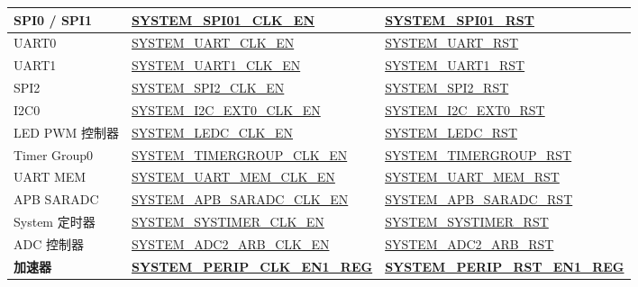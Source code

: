\documentclass[main\_\_CN.tex]{subfiles}
\begin{document}
\begin{ThreePartTable}
\begin{longtable}[c]{ |l|l|l| }
    SPI0 / SPI1     & \hyperref[fielddesc:SYSTEMSPI01CLKEN]{SYSTEM\_SPI01\_CLK\_EN}         & \hyperref[fielddesc:SYSTEMSPI01RST]{SYSTEM\_SPI01\_RST} \\\hline
    UART0           & \hyperref[fielddesc:SYSTEMUARTCLKEN]{SYSTEM\_UART\_CLK\_EN}          & \hyperref[fielddesc:SYSTEMUARTRST]{SYSTEM\_UART\_RST} \\\hline
    UART1           & \hyperref[fielddesc:SYSTEMUART1CLKEN]{SYSTEM\_UART1\_CLK\_EN}         & \hyperref[fielddesc:SYSTEMUART1RST]{SYSTEM\_UART1\_RST} \\\hline
    SPI2            & \hyperref[fielddesc:SYSTEMSPI2CLKEN]{SYSTEM\_SPI2\_CLK\_EN}          & \hyperref[fielddesc:SYSTEMSPI2RST]{SYSTEM\_SPI2\_RST} \\\hline
    I2C0            & \hyperref[fielddesc:SYSTEMI2CEXT0CLKEN]{SYSTEM\_I2C\_EXT0\_CLK\_EN}          & \hyperref[fielddesc:SYSTEMI2CEXT0RST]{SYSTEM\_I2C\_EXT0\_RST} \\\hline
    LED PWM 控制器 & \hyperref[fielddesc:SYSTEMLEDCCLKEN]{SYSTEM\_LEDC\_CLK\_EN}          & \hyperref[fielddesc:SYSTEMLEDCRST]{SYSTEM\_LEDC\_RST} \\\hline
    Timer Group0    & \hyperref[fielddesc:SYSTEMTIMERGROUPCLKEN]{SYSTEM\_TIMERGROUP\_CLK\_EN} & \hyperref[fielddesc:SYSTEMTIMERGROUPRST]{SYSTEM\_TIMERGROUP\_RST} \\\hline
    UART MEM    & \hyperref[fielddesc:SYSTEMUARTMEMCLKEN]{SYSTEM\_UART\_MEM\_CLK\_EN} \tnote{4} & \hyperref[fielddesc:SYSTEMUARTMEMRST]{SYSTEM\_UART\_MEM\_RST} \\\hline
    APB SARADC    & \hyperref[fielddesc:SYSTEMAPBSARADCCLKEN]{SYSTEM\_APB\_SARADC\_CLK\_EN} & \hyperref[fielddesc:SYSTEMAPBSARADCRST]{SYSTEM\_APB\_SARADC\_RST} \\\hline
    System 定时器    & \hyperref[fielddesc:SYSTEMSYSTIMERCLKEN]{SYSTEM\_SYSTIMER\_CLK\_EN} & \hyperref[fielddesc:SYSTEMSYSTIMERRST]{SYSTEM\_SYSTIMER\_RST} \\\hline
    ADC 控制器    & \hyperref[fielddesc:SYSTEMADC2ARBCLKEN]{SYSTEM\_ADC2\_ARB\_CLK\_EN} & \hyperref[fielddesc:SYSTEMADC2ARBRST]{SYSTEM\_ADC2\_ARB\_RST} \\\hline

    \textbf{加速器} & \textbf{\hyperref[regdesc:SYSTEMPERIPCLKEN1REG]{SYSTEM\_PERIP\_CLK\_EN1\_REG}} & \textbf{\hyperref[regdesc:SYSTEMPERIPRSTEN1REG]{SYSTEM\_PERIP\_RST\_EN1\_REG}} \\ \hline


\end{longtable}
\end{ThreePartTable}
\end{document}
